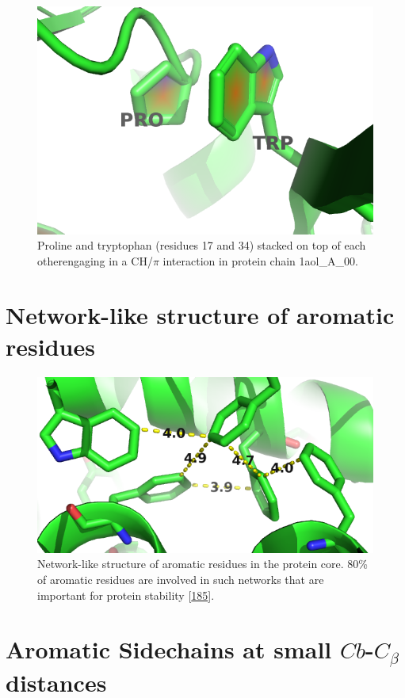 \documentclass[11pt,a4paper,twoside]{book}
\newcommand{\Cb}{C_\beta}
\theoremstyle{definition}
\theoremstyle{definition}
\theoremstyle{remark}
\begin{document}
\begin{figure}
\includegraphics[width=0.5\linewidth]{img/coupling_matrix_analysis/1aolA00_17_34} \caption{Proline and
tryptophan (residues 17 and 34) stacked on top of each otherengaging in
a CH/\(\pi\) interaction in protein chain 1aol\_A\_00.}\label{fig:coupling-matrix-aromatic-proline-pymol}
\end{figure}

\section{Network-like structure of aromatic
residues}\label{aromatic-network}






\begin{figure}
\includegraphics[width=0.5\linewidth]{img/coupling_matrix_analysis/aromatic_bundle} \caption{Network-like structure of aromatic
residues in the protein core. 80\% of aromatic residues are involved in
such networks that are important for protein stability
{[}\protect\hyperlink{ref-Burley1985}{185}{]}.}\label{fig:aromatic-network}
\end{figure}

\section{\texorpdfstring{Aromatic Sidechains at small \(Cb\)-\(\Cb\)
distances}{Aromatic Sidechains at small Cb-\textbackslash{}Cb distances}}\label{aromatic-small-distances}
\end{document}
